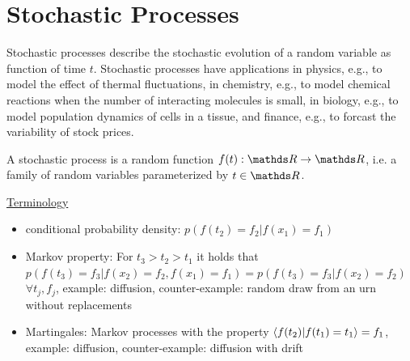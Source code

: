 \documentclass{notebook}
\begin{document}
\section{Stochastic Processes}
 
Stochastic processes describe the stochastic evolution of a random variable as function of time $t$. Stochastic processes have applications  in physics, e.g., to model the effect of thermal fluctuations,  in chemistry, e.g., to model chemical reactions when the number of interacting molecules is small,  in biology, e.g., to model population dynamics of cells in a tissue, and finance, e.g., to forcast the variability of stock prices.
%
\begin{theorem}
	A stochastic process is a random function $f(t):\R \to \R$, 
	i.e. a family of random variables parameterized by $t \in \R$.
\end{theorem}
%



\underline{Terminology}

\begin{itemize}
	\item{conditional probability density: $p(f(t_2) = f_2 | f(x_1) = f_1)$}
	\item{Markov property: For $t_3 > t_2 > t_1$ it holds that $p(f(t_3) = f_3 | f(x_2) = f_2, f(x_1)=f_1) = p(f(t_3) = f_3 | f(x_2) = f_2)$ $\forall t_j, f_j$, example: diffusion, counter-example: random draw from an urn without replacements}
	\item{Martingales: Markov processes with the property $\expval{f(t_2) | f(t_1) = t_1} = f_1$, example: diffusion, counter-example: diffusion with drift}
\end{itemize}
\end{document}
